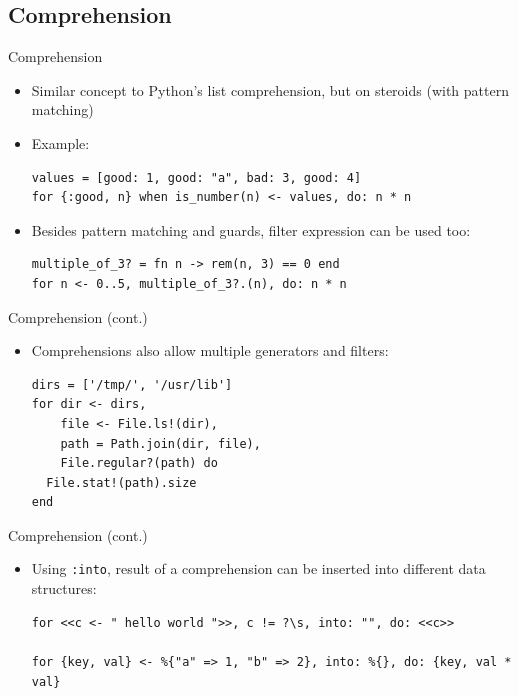 \documentclass[12pt]{beamer}
\begin{document}
\subsection{Comprehension}
\begin{frame}[fragile]{Comprehension}
  \begin{itemize}
    \item Similar concept to Python's list comprehension, but on steroids (with pattern matching)
    \item Example:
          \begin{verbatim}
values = [good: 1, good: "a", bad: 3, good: 4]
for {:good, n} when is_number(n) <- values, do: n * n
  \end{verbatim}
    \item Besides pattern matching and guards, filter expression can be used too:
          \begin{verbatim}
multiple_of_3? = fn n -> rem(n, 3) == 0 end
for n <- 0..5, multiple_of_3?.(n), do: n * n
  \end{verbatim}
  \end{itemize}
\end{frame}

\begin{frame}[fragile]{Comprehension (cont.)}
  \begin{itemize}
    \item Comprehensions also allow multiple generators and filters:
          \begin{verbatim}
dirs = ['/tmp/', '/usr/lib']
for dir <- dirs,
    file <- File.ls!(dir),
    path = Path.join(dir, file),
    File.regular?(path) do
  File.stat!(path).size
end
  \end{verbatim}
  \end{itemize}
\end{frame}

\begin{frame}[fragile]{Comprehension (cont.)}
  \begin{itemize}
    \item Using \texttt{:into}, result of a comprehension can be inserted into different data structures:
          \begin{verbatim}
for <<c <- " hello world ">>, c != ?\s, into: "", do: <<c>>

for {key, val} <- %{"a" => 1, "b" => 2}, into: %{}, do: {key, val * val}
  \end{verbatim}
  \end{itemize}
\end{frame}
\end{document}

